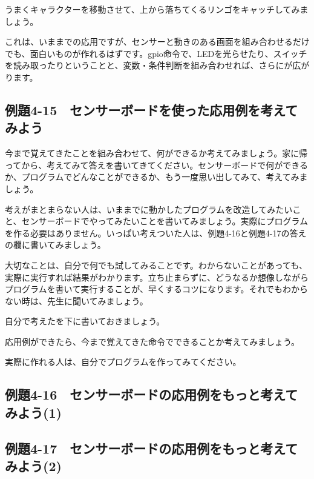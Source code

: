 うまくキャラクターを移動させて、上から落ちてくるリンゴをキャッチしてみましょう。

これは、いままでの応用ですが、センサーと動きのある画面を組み合わせるだけでも、面白いものが作れるはずです。gpio命令で、LEDを光らせたり、スイッチを読み取ったりということと、変数・条件判断を組み合わせれば、さらにが広がります。


\newpage
\subsection{例題4-15　センサーボードを使った応用例を考えてみよう}


\begin{description}
    \item {}
\end{description}

今まで覚えてきたことを組み合わせて、何ができるか考えてみましょう。家に帰ってから、考えてみて答えを書いてきてください。センサーボードで何ができるか、プログラムでどんなことができるか、もう一度思い出してみて、考えてみましょう。

考えがまとまらない人は、いままでに動かしたプログラムを改造してみたいこと、センサーボードでやってみたいことを書いてみましょう。実際にプログラムを作る必要はありません。いっぱい考えついた人は、例題4-16と例題4-17の答えの欄に書いてみましょう。

大切なことは、自分で何でも試してみることです。わからないことがあっても、実際に実行すれば結果がわかります。立ち止まらずに、どうなるか想像しながらプログラムを書いて実行することが、早くするコツになります。それでもわからない時は、先生に聞いてみましょう。

\begin{description}
    \item {}
\end{description}

自分で考えたを下に書いておきましょう。

応用例ができたら、今まで覚えてきた命令でできることか考えてみましょう。

実際に作れる人は、自分でプログラムを作ってみてください。


\newpage
\subsection{例題4-16　センサーボードの応用例をもっと考えてみよう(1)}

\begin{description}
    \item {}
\end{description}

\newpage
\subsection{例題4-17　センサーボードの応用例をもっと考えてみよう(2)}

\begin{description}
    \item {}
\end{description}


